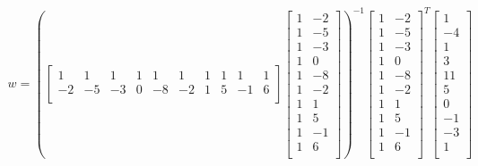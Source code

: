\documentclass[12pt]{article}
\begin{document}
\begin{enumerate}
\begin{enumerate}
\begin{equation}
	\begin{split}
		w = (\begin{bmatrix}
			1 & 1 & 1 & 1 & 1 & 1 & 1 & 1 & 1 & 1\\
			-2 & -5 & -3 & 0 & -8 & -2 & 1 & 5 & -1 & 6\\
		\end{bmatrix}\begin{bmatrix}
			1 & -2\\
			1 & -5\\	
			1 & -3\\
			1 & 0\\
			1 & -8\\
			1 & -2\\
			1 & 1\\
			1 & 5\\
			1 & -1\\
			1 & 6\\
		\end{bmatrix})^{-1}\begin{bmatrix}
		1 & -2\\
		1 & -5\\	
		1 & -3\\
		1 & 0\\
		1 & -8\\
		1 & -2\\
		1 & 1\\
		1 & 5\\
		1 & -1\\
		1 & 6\\
	\end{bmatrix}^{T}\begin{bmatrix}
			1\\
			-4\\	
			1\\
			3\\
			11\\
			5\\
			0\\
			-1\\
			-3\\
			1\\
		\end{bmatrix}
	\end{split}
\end{equation}


\end{enumerate}
\end{enumerate}
\end{document}
